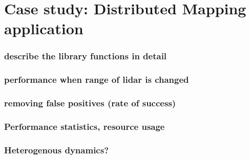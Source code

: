 \section{Case study: Distributed Mapping application}
\subsubsection{describe the library functions in detail}
\subsubsection{performance when range of lidar is changed}
\subsubsection{removing false positives (rate of success)}
\subsubsection{Performance statistics, resource usage}
\subsubsection{Heterogenous dynamics?}